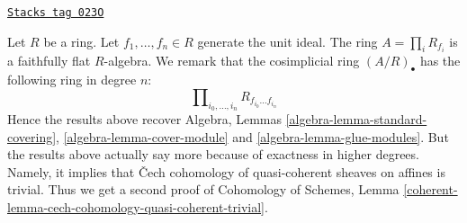 \begin{remark}
\label{descent-remark-standard-covering}
\href{https://stacks.math.columbia.edu/tag/023O}{\texttt{Stacks tag 023O}}

Let $R$ be a ring. Let $f_1, \ldots, f_n\in R$ generate the
unit ideal. The ring $A = \prod_i R_{f_i}$ is a faithfully flat
$R$-algebra. We remark that the cosimplicial ring $(A/R)_\bullet$
has the following ring in degree $n$:
$$
\prod\nolimits_{i_0, \ldots, i_n} R_{f_{i_0}\ldots f_{i_n}}
$$
Hence the results above recover
Algebra, Lemmas \ref{algebra-lemma-standard-covering},
\ref{algebra-lemma-cover-module} and \ref{algebra-lemma-glue-modules}.
But the results above actually say more because of exactness
in higher degrees. Namely, it implies that {\v C}ech cohomology of
quasi-coherent sheaves on affines is trivial. Thus we get a second
proof of Cohomology of Schemes, Lemma
\ref{coherent-lemma-cech-cohomology-quasi-coherent-trivial}.
\end{remark}

